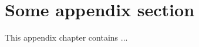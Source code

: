 
\appendix
{}

\section{Some appendix section}
\label{app:fitresults}
This appendix chapter contains ...